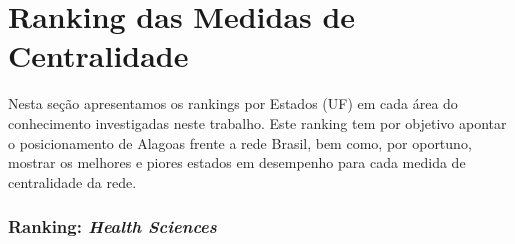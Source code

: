 
\section{\textbf{Ranking das Medidas de Centralidade}}

Nesta seção apresentamos os rankings por Estados (UF) em cada área do conhecimento investigadas neste trabalho. Este ranking tem por objetivo apontar o posicionamento de Alagoas frente a rede Brasil, bem como, por oportuno, mostrar os melhores e piores estados em desempenho para cada medida de centralidade da rede. 

\subsubsection{Ranking: \textit{Health Sciences}}

